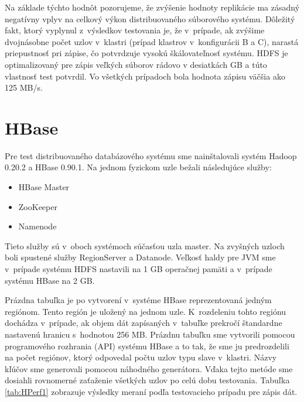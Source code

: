 \documentclass[11pt,twoside,a4paper]{book}
\begin{document}
% 
% 

Na základe týchto hodnôt pozorujeme, že zvýšenie hodnoty replikácie ma zásadný negatívny vplyv na celkový výkon distribuovaného súborového systému. Dôležitý fakt, ktorý vyplynul z~výsledkov testovania je, že v~prípade, ak zvýšime dvojnásobne počet uzlov v~klastri (prípad klastrov v~konfigurácii B a C), narastá priepustnosť pri zápise, čo potvrdzuje vysokú škálovateľnosť systému. HDFS je optimalizovaný pre zápis veľkých súborov rádovo v desiatkách GB a túto vlastnosť test potvrdil. Vo všetkých prípadoch bola hodnota zápisu väčšia ako 125 MB/s. 


\section{HBase}

Pre test distribuovaného databázového systému sme nainštalovali systém Hadoop 0.20.2 a HBase 0.90.1. Na jednom fyzickom uzle bežali následujúce služby:

\begin{itemize}
 \item HBase Master
 \item ZooKeeper
 \item Namenode 
\end{itemize}

Tieto služby sú v~oboch systémoch súčasťou uzla master. Na zvyšných uzloch boli spustené služby RegionServer a Datanode. Veľkosť haldy pre JVM sme v~prípade systému HDFS nastavili na 1 GB operačnej pamäti a v~prípade systému HBase na 2 GB.

Prázdna tabuľka je po vytvorení v~systéme HBase reprezentovaná  jedným regiónom. Tento región je uložený na jednom uzle. K~rozdeleniu tohto regiónu dochádza v~prípade, ak objem dát zapísaných v~tabuľke prekročí štandardne nastavenú hranicu s~hodnotou 256 MB. Prázdnu tabuľku sme vytvorili pomocou programového rozhrania (API) systému HBase a to tak, že sme ju predrozdelili na počet regiónov, ktorý odpovedal počtu uzlov typu slave v~klastri. Názvy kľúčov sme generovali pomocou náhodného generátora. Vďaka tejto metóde sme dosiahli rovnomerné zaťaženie všetkých uzlov po celú dobu testovania. Tabuľka \ref{tab:HPerf1} zobrazuje výsledky meraní podľa testovacieho prípadu pre zápis dát. 
\end{document}
